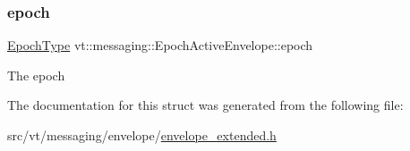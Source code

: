 \subsubsection{\texorpdfstring{epoch}{epoch}}
{\footnotesize\ttfamily \hyperlink{namespacevt_a985a5adf291c34a3ca263b3378388236}{Epoch\+Type} vt\+::messaging\+::\+Epoch\+Active\+Envelope\+::epoch}

The epoch 

The documentation for this struct was generated from the following file\+:\begin{DoxyCompactItemize}
\item 
src/vt/messaging/envelope/\hyperlink{envelope__extended_8h}{envelope\+\_\+extended.\+h}\end{DoxyCompactItemize}
